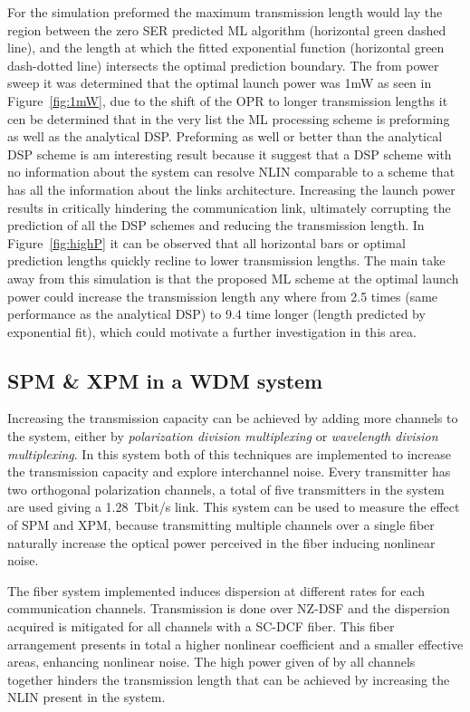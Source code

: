For the simulation preformed the maximum transmission length would lay the region between the zero SER predicted ML algorithm (horizontal green dashed line), and the length at which the fitted exponential function (horizontal green dash-dotted line) intersects the optimal prediction boundary. The from power sweep it was determined that the optimal launch power was 1mW as seen in Figure~\ref{fig:1mW}, due to the shift of the OPR to longer transmission lengths it cen be determined that in the very list the ML processing scheme is preforming as well  as the analytical DSP. Preforming as well or better than the analytical DSP scheme is am interesting result because it suggest that a DSP scheme with no information about the system can resolve NLIN comparable to a scheme that has all the information about the links architecture.
Increasing the launch power results in critically hindering the communication link, ultimately corrupting the prediction of all the DSP schemes and reducing the transmission length. In Figure~\ref{fig:highP} it can be observed that all horizontal bars or optimal prediction lengths quickly recline to lower transmission lengths. The main take away from this simulation is that the proposed ML scheme at the optimal launch power could increase the transmission length any where from 2.5 times (same performance as the analytical DSP) to 9.4 time longer (length predicted by exponential fit), which could motivate a further investigation in this area.




\subsection{SPM \& XPM in a WDM system}

Increasing the transmission capacity can be achieved by adding more channels to the system, either by \textit{polarization division multiplexing} or \textit{wavelength division multiplexing}. In this system both of this techniques are implemented to increase the transmission capacity and explore interchannel noise. Every transmitter has two orthogonal polarization channels, a total of five transmitters in the system are used giving a 1.28~Tbit/s link. This system can be used to measure the effect of SPM and XPM, because transmitting multiple channels over a single fiber naturally increase the optical power perceived in the fiber inducing nonlinear noise. 

The fiber system implemented  induces dispersion at different rates for each communication channels. Transmission is done over NZ-DSF and the dispersion acquired is mitigated for all channels with a SC-DCF fiber. This fiber arrangement presents in total a higher nonlinear coefficient and a smaller effective areas, enhancing nonlinear noise. The high power given of by all channels together hinders the transmission length that can be achieved by increasing the NLIN present in the system.

